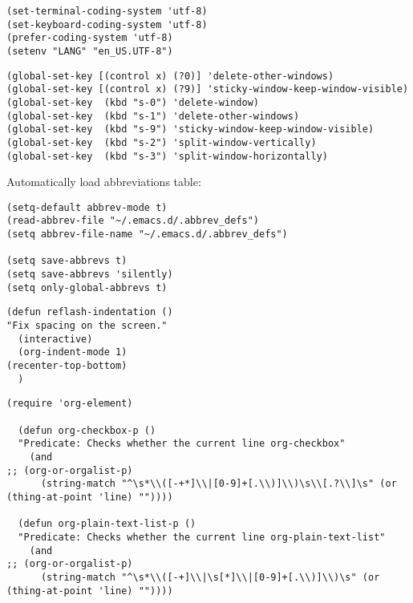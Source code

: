 \documentclass[11pt]{article}
\begin{document}
\begin{verbatim}
(set-terminal-coding-system 'utf-8)
(set-keyboard-coding-system 'utf-8)
(prefer-coding-system 'utf-8)
(setenv "LANG" "en_US.UTF-8")
\end{verbatim}

\label{sec:org074b624}

\begin{verbatim}
(global-set-key [(control x) (?0)] 'delete-other-windows)
(global-set-key [(control x) (?9)] 'sticky-window-keep-window-visible)
(global-set-key  (kbd "s-0") 'delete-window)
(global-set-key  (kbd "s-1") 'delete-other-windows)
(global-set-key  (kbd "s-9") 'sticky-window-keep-window-visible)
(global-set-key  (kbd "s-2") 'split-window-vertically)
(global-set-key  (kbd "s-3") 'split-window-horizontally)
\end{verbatim}

\label{sec:org8f0b8a3}
Automatically load abbreviations table:
\begin{verbatim}
(setq-default abbrev-mode t)
(read-abbrev-file "~/.emacs.d/.abbrev_defs")
(setq abbrev-file-name "~/.emacs.d/.abbrev_defs")

(setq save-abbrevs t)
(setq save-abbrevs 'silently)
(setq only-global-abbrevs t)
\end{verbatim}
\label{sec:org3617e62}
\begin{verbatim}
(defun reflash-indentation ()
"Fix spacing on the screen."
  (interactive)
  (org-indent-mode 1)
(recenter-top-bottom)
  )
\end{verbatim}
\label{sec:org0c94226}

\begin{verbatim}
(require 'org-element) 

  (defun org-checkbox-p ()
  "Predicate: Checks whether the current line org-checkbox"
    (and
;; (org-or-orgalist-p)
      (string-match "^\s*\\([-+*]\\|[0-9]+[.\\)]\\)\s\\[.?\\]\s" (or (thing-at-point 'line) ""))))

  (defun org-plain-text-list-p ()
  "Predicate: Checks whether the current line org-plain-text-list"
    (and
;; (org-or-orgalist-p)
      (string-match "^\s*\\([-+]\\|\s[*]\\|[0-9]+[.\\)]\\)\s" (or (thing-at-point 'line) ""))))
\end{verbatim}
\label{sec:org2db6f47}
\end{document}
